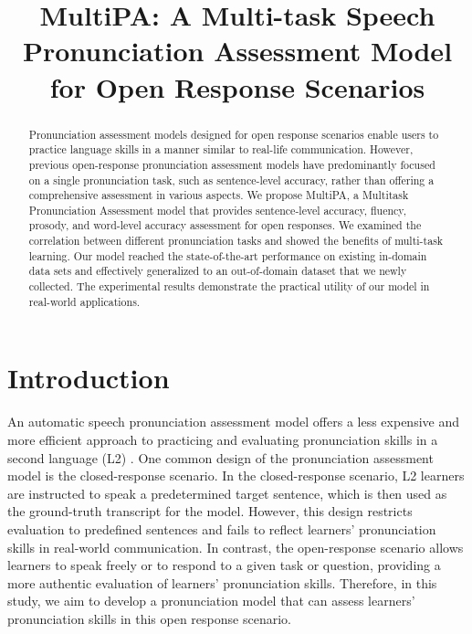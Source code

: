 \documentclass{Interspeech2024}
\title{MultiPA: A Multi-task Speech Pronunciation Assessment Model for Open Response Scenarios}
\begin{document}
\maketitle

\begin{abstract}
Pronunciation assessment models designed for open response scenarios enable users to practice language skills in a manner similar to real-life communication. However, previous open-response pronunciation assessment models have predominantly focused on a single pronunciation task, such as sentence-level accuracy, rather than offering a comprehensive assessment in various aspects. We propose MultiPA, a Multitask Pronunciation Assessment model that provides sentence-level accuracy, fluency, prosody, and word-level accuracy assessment for open responses. We examined the correlation between different pronunciation tasks and showed the benefits of multi-task learning. Our model reached the state-of-the-art performance on existing in-domain data sets and effectively generalized to an out-of-domain dataset that we newly collected. The experimental results demonstrate the practical utility of our model in real-world applications.

\end{abstract}



\section{Introduction}

An automatic speech pronunciation assessment model offers a less expensive and more efficient approach to practicing and evaluating pronunciation skills in a second language (L2) \cite{ehsani1998speech, egan1999speaking}. One common design of the pronunciation assessment model is the closed-response scenario. In the closed-response scenario, L2 learners are instructed to speak a predetermined target sentence, which is then used as the ground-truth transcript for the model. However, this design restricts evaluation to predefined sentences and fails to reflect learners' pronunciation skills in real-world communication. In contrast, the open-response scenario allows learners to  speak freely or to respond to a given task or question, providing a more authentic evaluation of learners' pronunciation skills. Therefore, in this study, we aim to develop a pronunciation model that can assess learners' pronunciation skills in this open response scenario. 
\end{document}
